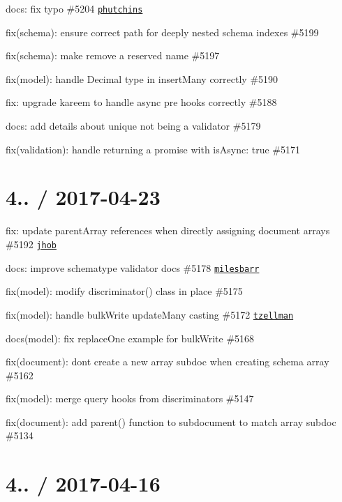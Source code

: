 \begin{DoxyItemize}
\item docs\+: fix typo \#5204 \href{https://github.com/phutchins}{\tt phutchins}
\item fix(schema)\+: ensure correct path for deeply nested schema indexes \#5199
\item fix(schema)\+: make remove a reserved name \#5197
\item fix(model)\+: handle Decimal type in insert\+Many correctly \#5190
\item fix\+: upgrade kareem to handle async pre hooks correctly \#5188
\item docs\+: add details about unique not being a validator \#5179
\item fix(validation)\+: handle returning a promise with is\+Async\+: true \#5171
\end{DoxyItemize}

\section*{4.. / 2017-\/04-\/23 }


\begin{DoxyItemize}
\item fix\+: update {\ttfamily parent\+Array} references when directly assigning document arrays \#5192 \href{https://github.com/jhob}{\tt jhob}
\item docs\+: improve schematype validator docs \#5178 \href{https://github.com/milesbarr}{\tt milesbarr}
\item fix(model)\+: modify discriminator() class in place \#5175
\item fix(model)\+: handle bulk\+Write update\+Many casting \#5172 \href{https://github.com/tzellman}{\tt tzellman}
\item docs(model)\+: fix replace\+One example for bulk\+Write \#5168
\item fix(document)\+: don\textquotesingle{}t create a new array subdoc when creating schema array \#5162
\item fix(model)\+: merge query hooks from discriminators \#5147
\item fix(document)\+: add parent() function to subdocument to match array subdoc \#5134
\end{DoxyItemize}

\section*{4.. / 2017-\/04-\/16 }


